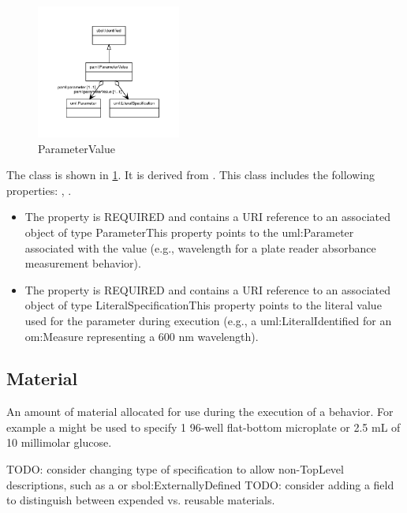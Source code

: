 \begin{figure}[h!]%
\centering%
\includegraphics[width=0.42148936170212764\textwidth]{paml_classes/ParameterValue_abstraction_hierarchy.pdf}%
\caption{ParameterValue}%
\label{fig:ParameterValue}%
\end{figure}

%
The  class is shown in \ref{fig:ParameterValue}. It is derived from .%
This class includes the following properties: , . %
\begin{itemize}%
\item%
The  property is REQUIRED and contains a URI reference to an associated object of type ParameterThis property points to the uml:Parameter associated with the value (e.g., wavelength for a
        plate reader absorbance measurement behavior).%
\item%
The  property is REQUIRED and contains a URI reference to an associated object of type LiteralSpecificationThis property points to the literal value used for the parameter during execution (e.g., a
        uml:LiteralIdentified for an om:Measure representing a 600 nm wavelength).%
\end{itemize}%
\subsection{Material}%
\label{sec:paml:Material}%
An amount of material allocated for use during the execution of a behavior.
        For example a  might be used to specify 1 96-well flat-bottom microplate or 2.5 mL of 10 millimolar glucose.

        TODO: consider changing type of specification to allow non-TopLevel descriptions, such as a  or sbol:ExternallyDefined
        TODO: consider adding a field to distinguish between expended vs. reusable materials.%
\newline%
\linebreak%


